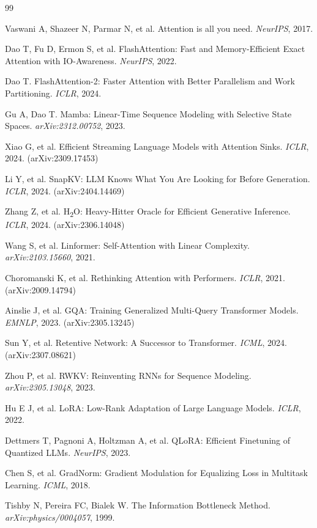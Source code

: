 \documentclass[11pt]{article}
\begin{document}
\begin{thebibliography}{99}

Vaswani A, Shazeer N, Parmar N, et al. Attention is all you need.
\textit{NeurIPS}, 2017.

Dao T, Fu D, Ermon S, et al. FlashAttention: Fast and Memory-Efficient Exact Attention with IO-Awareness.
\textit{NeurIPS}, 2022.

Dao T. FlashAttention-2: Faster Attention with Better Parallelism and Work Partitioning.
\textit{ICLR}, 2024.

Gu A, Dao T. Mamba: Linear-Time Sequence Modeling with Selective State Spaces.
\textit{arXiv:2312.00752}, 2023.

Xiao G, et al. Efficient Streaming Language Models with Attention Sinks.
\textit{ICLR}, 2024. (arXiv:2309.17453)

Li Y, et al. SnapKV: LLM Knows What You Are Looking for Before Generation.
\textit{ICLR}, 2024. (arXiv:2404.14469)

Zhang Z, et al. H\textsubscript{2}O: Heavy-Hitter Oracle for Efficient Generative Inference.
\textit{ICLR}, 2024. (arXiv:2306.14048)

Wang S, et al. Linformer: Self-Attention with Linear Complexity.
\textit{arXiv:2103.15660}, 2021.

Choromanski K, et al. Rethinking Attention with Performers.
\textit{ICLR}, 2021. (arXiv:2009.14794)

Ainslie J, et al. GQA: Training Generalized Multi-Query Transformer Models.
\textit{EMNLP}, 2023. (arXiv:2305.13245)

Sun Y, et al. Retentive Network: A Successor to Transformer.
\textit{ICML}, 2024. (arXiv:2307.08621)

Zhou P, et al. RWKV: Reinventing RNNs for Sequence Modeling.
\textit{arXiv:2305.13048}, 2023.

Hu E J, et al. LoRA: Low-Rank Adaptation of Large Language Models.
\textit{ICLR}, 2022.

Dettmers T, Pagnoni A, Holtzman A, et al. QLoRA: Efficient Finetuning of Quantized LLMs.
\textit{NeurIPS}, 2023.

Chen S, et al. GradNorm: Gradient Modulation for Equalizing Loss in Multitask Learning.
\textit{ICML}, 2018.

Tishby N, Pereira FC, Bialek W. The Information Bottleneck Method.
\textit{arXiv:physics/0004057}, 1999.

\end{thebibliography}
\end{document}
